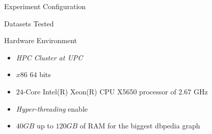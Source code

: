 \begin{frame}[fragile]{Experiment Configuration}
  \begin{block}{Datasets Tested}
    \begin{table}[H]
      \centering
     \end{table}
  \end{block}
  \begin{block}{Hardware Environment}
    \begin{itemize}
          \item \emph{HPC Cluster at UPC}
          \item $x86$ $64$ bits
          \item $24$-Core Intel(R) Xeon(R) CPU X5650 processor of $2.67$ GHz
          \item \emph{Hyper-threading} enable
          \item $40 GB$ up to $120 GB$ of RAM for the biggest \acrfull{dbpedia} graph
      \end{itemize}        
  \end{block}
\end{frame}

